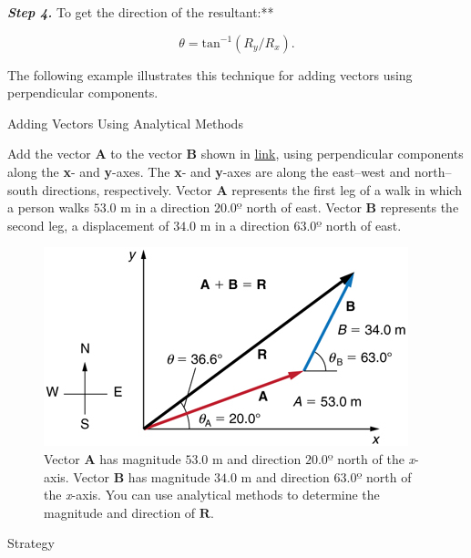 \documentclass[
]{book}
\newenvironment{tinysection}{}{}
\begin{document}
\emph{\textbf{Step 4.} }To get the direction of the resultant:**

\leavevmode\hypertarget{eip-173}{}%
\[{{\theta = \text{tan}^{- 1}}({R_{y}/R_{x}})}\text{.}{}\]

The following example illustrates this technique for adding vectors
using perpendicular components.

\hypertarget{fs-id1608746}{}
Adding Vectors Using Analytical Methods

Add the vector \(\mathbf{A}{}\) to the vector \(\mathbf{B}{}\) shown in
\protect\hyperlink{import-auto-id1165296662297}{link}, using
perpendicular components along the \textbf{x}- and \textbf{y}-axes. The \textbf{x}- and
\textbf{y}-axes are along the east--west and north--south directions,
respectively. Vector \(\mathbf{A}{}\) represents the first leg of a walk
in which a person walks \({\text{53}\text{.}\text{0\ m}}{}\) in a
direction \({\text{20}\text{.}0\text{º}}{}\) north of east. Vector
\(\mathbf{B}{}\) represents the second leg, a displacement of
\({\text{34}\text{.}\text{0\ m}}{}\) in a direction
\({\text{63}\text{.}0\text{º}}{}\) north of east.

\begin{figure}
\hypertarget{import-auto-id1165296662297}{%
\centering
\includegraphics{images/Figure_03_03_08a.jpg}
\caption{Vector \(\mathbf{A}{}\) has magnitude \({\text{53}\text{.}\text{0\ m}}{}\)
and direction \({\text{20}\text{.}0º}{}\) north of the \emph{x}-axis. Vector
\(\mathbf{B}{}\) has magnitude \({\text{34}\text{.}\text{0\ m}}{}\) and
direction \({\text{63}\text{.}0\text{º}}{}\) north of the \emph{x}-axis. You
can use analytical methods to determine the magnitude and direction of
\(\mathbf{R}{}\).}\label{import-auto-id1165296662297}
}
\end{figure}

\begin{tinysection}

{Strategy}

\end{tinysection}
\end{document}
